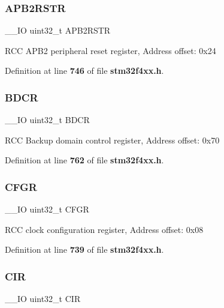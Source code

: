 \mbox{\label{structRCC__TypeDef_ab2c5389c9ff4ac188cd498b8f7170968}} 
\subsubsection{A\+P\+B2\+R\+S\+TR}
{\footnotesize\ttfamily \+\_\+\+\_\+\+IO uint32\+\_\+t A\+P\+B2\+R\+S\+TR}

R\+CC A\+P\+B2 peripheral reset register, Address offset\+: 0x24 

Definition at line \textbf{ 746} of file \textbf{ stm32f4xx.\+h}.

\mbox{\label{structRCC__TypeDef_a0b9a3ced775287c8585a6a61af4b40e9}} 
\subsubsection{B\+D\+CR}
{\footnotesize\ttfamily \+\_\+\+\_\+\+IO uint32\+\_\+t B\+D\+CR}

R\+CC Backup domain control register, Address offset\+: 0x70 

Definition at line \textbf{ 762} of file \textbf{ stm32f4xx.\+h}.

\mbox{\label{structRCC__TypeDef_a26f1e746ccbf9c9f67e7c60e61085ec1}} 
\subsubsection{C\+F\+GR}
{\footnotesize\ttfamily \+\_\+\+\_\+\+IO uint32\+\_\+t C\+F\+GR}

R\+CC clock configuration register, Address offset\+: 0x08 

Definition at line \textbf{ 739} of file \textbf{ stm32f4xx.\+h}.

\mbox{\label{structRCC__TypeDef_a907d8154c80b7e385478943f90b17a3b}} 
\subsubsection{C\+IR}
{\footnotesize\ttfamily \+\_\+\+\_\+\+IO uint32\+\_\+t C\+IR}

